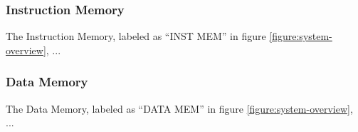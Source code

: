 \subsubsection{Instruction Memory}

The Instruction Memory, labeled as ``INST MEM'' in figure \vref{figure:system-overview}, ...

\subsubsection{Data Memory}

The Data Memory, labeled as ``DATA MEM'' in figure \vref{figure:system-overview}, ...

